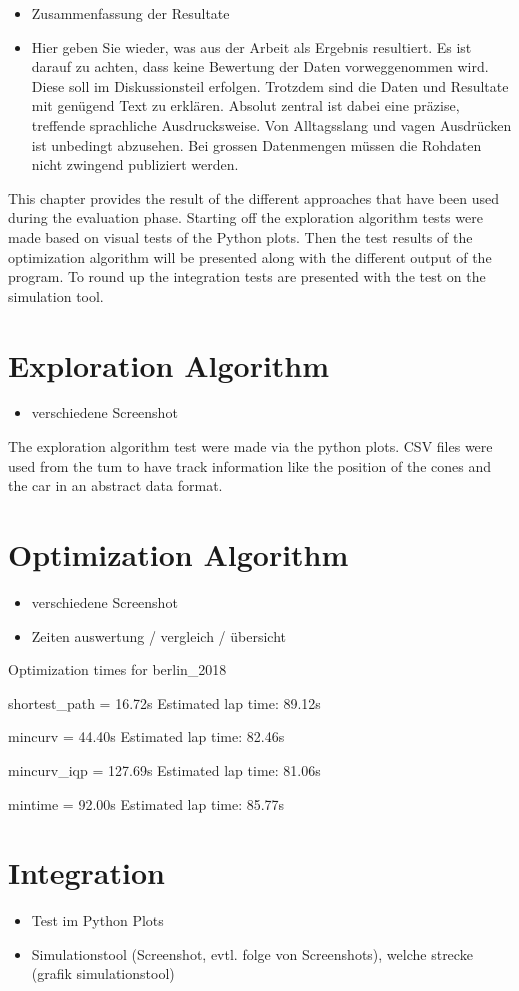 \begin{itemize}
    \item Zusammenfassung der Resultate
    \item Hier geben Sie wieder, was aus der Arbeit als Ergebnis resultiert. Es ist darauf zu achten, dass keine Bewertung der Daten vorweggenommen wird. Diese soll im Diskussionsteil erfolgen. Trotzdem sind die Daten und Resultate mit genügend Text zu erklären. Absolut zentral ist dabei eine präzise, treffende sprachliche Ausdrucksweise. Von Alltagsslang und vagen Ausdrücken ist unbedingt abzusehen.
          Bei grossen Datenmengen müssen die Rohdaten nicht zwingend publiziert werden.
\end{itemize}

This chapter provides the result of the different approaches that have been used during the evaluation phase. Starting off the exploration algorithm tests were made based on visual tests of the Python plots. Then the test results of the optimization algorithm will be presented along with the different output of the program. To round up the integration tests are presented with the test on the simulation tool.

\section{Exploration Algorithm}
\begin{itemize}
    \item verschiedene Screenshot
\end{itemize}
The exploration algorithm test were made via the python plots. CSV files were used from the \acrlong{tum} to have track information like the position of the cones and the car in an abstract data format. \cite{tumftm_optimization_algoritm}

\section{Optimization Algorithm}
\begin{itemize}
    \item verschiedene Screenshot
    \item Zeiten auswertung / vergleich / übersicht
\end{itemize}
Optimization times for berlin\_2018

shortest\_path = 16.72s
Estimated lap time: 89.12s

mincurv = 44.40s
Estimated lap time: 82.46s

mincurv\_iqp = 127.69s
Estimated lap time: 81.06s

mintime = 92.00s
Estimated lap time: 85.77s

\section{Integration}
\begin{itemize}
    \item Test im Python Plots
    \item Simulationstool (Screenshot, evtl. folge von Screenshots), welche strecke (grafik simulationstool)
\end{itemize}

